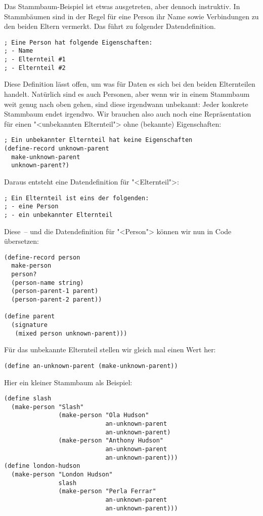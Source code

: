 Das Stammbaum-Beispiel ist etwas ausgetreten, aber dennoch instruktiv.
In Stammbäumen sind in der Regel für eine Person ihr Name sowie
Verbindungen zu den beiden Eltern vermerkt.  Das führt zu folgender
Datendefinition.
%
\begin{lstlisting}
; Eine Person hat folgende Eigenschaften:
; - Name
; - Elternteil #1
; - Elternteil #2
\end{lstlisting}
%
Diese Definition lässt offen, um was für Daten es sich bei den beiden
Elternteilen handelt.  Natürlich sind es auch Personen, aber wenn wir
in einem Stammbaum weit genug nach oben gehen, sind diese irgendwann
unbekannt: Jeder konkrete Stammbaum endet irgendwo.  Wir brauchen also
auch noch eine Repräsentation für einen "<unbekannten Elternteil">
ohne (bekannte) Eigenschaften:
%
\begin{lstlisting}
; Ein unbekannter Elternteil hat keine Eigenschaften
(define-record unknown-parent
  make-unknown-parent
  unknown-parent?)
\end{lstlisting}
%
Daraus entsteht eine Datendefinition für "<Elternteil">:
%
\begin{lstlisting}
; Ein Elternteil ist eins der folgenden:
; - eine Person
; - ein unbekannter Elternteil
\end{lstlisting}
%
Diese~-- und die Datendefinition für "<Person"> können wir nun in Code
übersetzen:
%
\begin{lstlisting}
(define-record person
  make-person
  person?
  (person-name string)
  (person-parent-1 parent)
  (person-parent-2 parent))

(define parent
  (signature
   (mixed person unknown-parent)))
\end{lstlisting}
%
Für das unbekannte Elternteil stellen wir gleich mal einen Wert her:
%
\begin{lstlisting}
(define an-unknown-parent (make-unknown-parent))
\end{lstlisting}
%
Hier ein kleiner Stammbaum als Beispiel:
%
\begin{lstlisting}
(define slash
  (make-person "Slash"
               (make-person "Ola Hudson"
                            an-unknown-parent
                            an-unknown-parent)
               (make-person "Anthony Hudson"
                            an-unknown-parent
                            an-unknown-parent)))
(define london-hudson
  (make-person "London Hudson"
               slash
               (make-person "Perla Ferrar"
                            an-unknown-parent
                            an-unknown-parent)))
\end{lstlisting}
